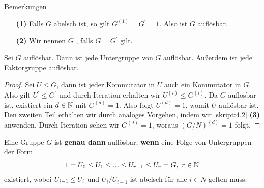 \begin{generic_no_num}{Bemerkungen}  \
	\begin{enumerate}
		\item[\textbf{(1)}]
		Falls $ G $ abelsch ist, so gilt $ G^{(1)} = G^\prime = 1 $. Also ist $ G $ auflösbar.
		\item[\textbf{(2)}] 
		Wir nennen $ G $ , falls $ G = G^\prime $ gilt.
	\end{enumerate}
\end{generic_no_num}

\begin{lemma} \label{skript:4.4}
	Sei $ G $ auflösbar. Dann ist jede Untergruppe von $ G $ auflösbar.
	Außerdem ist jede Faktorgruppe auflösbar.
\end{lemma}

\begin{proof}
	Sei $ U \leq G $, dann ist jeder Kommutator in $ U $ auch ein Kommutator in $ G $. Also gilt $ U^\prime \leq G^\prime $ und durch Iteration erhalten wir $ U^{(i)} \leq G^{(i)} $.
	Da $ G $ auflösbar ist, existiert ein $ d \in \mathbb{N} $ mit $ G^{(d)} =1 $. Also folgt $ U^{(d)} = 1 $, womit $ U $ auflösbar ist.
	Den zweiten Teil erhalten wir durch analoges Vorgehen, indem wir \ref{skript:4.2} \textbf{(3)} anwenden. Durch Iteration sehen wir $ G^{(d)} = 1 $, woraus $ (G/N)^{(d)} =1  $ folgt.
\end{proof}

\begin{lemma} \label{skript:4.5}
	Eine Gruppe $ G $ ist \textbf{genau dann} auflösbar, \textbf{wenn} eine Folge von Untergruppen der Form
	\begin{align*}
	1 = U_0 \leq U_1 \leq ... \leq U_{r-1} \leq U_r = G, \ r \in \mathbb{N}
	\end{align*}
	existiert, wobei $ U_{i-1} \unlhd U_i$ und $ U_i / U_{i-1} $ ist abelsch für alle $ i \in N $ gelten muss.
\end{lemma}

